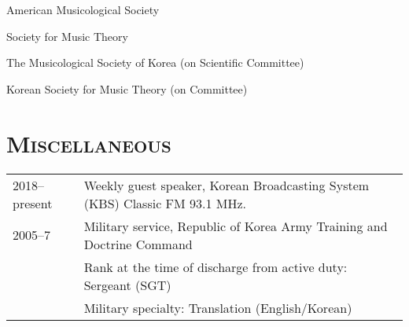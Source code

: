 \documentclass[a4paper,11pt]{article}
\begin{document}
  American Musicological Society
  
  \noindent Society for Music Theory
  
  \noindent The Musicological Society of Korea (on Scientific Committee)
  
  \noindent Korean Society for Music Theory (on Committee)
  
  \section*{\textsc{Miscellaneous}}
  
  \hspace*{-0.25cm}
  \begin{tabular}{p{2.5cm} l}
    2018–present & Weekly guest speaker, Korean Broadcasting System (KBS) Classic FM 93.1 MHz.\\
    
    2005–7 & Military service, Republic of Korea Army Training and Doctrine Command\\
    & Rank at the time of discharge from active duty: Sergeant (SGT)\\
    & Military specialty: Translation (English/Korean)
  \end{tabular}
\end{document}
